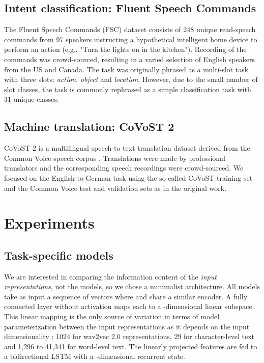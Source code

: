 \documentclass{article}
\begin{document}
\subsection{Intent classification: Fluent Speech Commands}
\label{sec:intent-task}

The Fluent Speech Commands (FSC) dataset \cite{lugosch2019speech} consists of 248 unique read-speech commands from 97 speakers instructing a hypothetical intelligent home device to perform an action (e.g., "Turn the lights on in the kitchen"). Recording of the commands was crowd-sourced, resulting in a varied selection of English speakers from the US and Canada. The task was originally phrased as a multi-slot task with three slots: \textit{action}, \textit{object} and \textit{location}. However, due to the small number of slot classes, the task is commonly rephrased as a simple classification task with 31 unique classes.


\subsection{Machine translation: CoVoST 2}
\label{sec:mt-task}

CoVoST 2 is a multilingual speech-to-text translation dataset \cite{wang2020covost} derived from the Common Voice speech corpus \cite{commonvoice:2020}. Translations were made by professional translators and the corresponding speech recordings were crowd-sourced. We focused on the English-to-German task using the so-called CoVoST training set and the Common Voice test and validation sets as in the original work. 


\section{Experiments}
\label{sec:exps}


\subsection{Task-specific models}
\label{sec:Model}


We are interested in comparing the information content of the \textit{input representations}, not the models, so we chose a minimalist architecture. All models take as input a sequence of vectors  where  and share a similar encoder. A fully connected layer without activation maps each  to a -dimensional linear subspace. This linear mapping is the only source of variation in terms of model parameterization between the input representations as it depends on the input dimensionality ; 1024 for wav2vec 2.0 representations, 29 for character-level text and 1,296 to 41,341 for word-level text. The linearly projected features are fed to a bidirectional LSTM with a -dimensional recurrent state.
\end{document}

